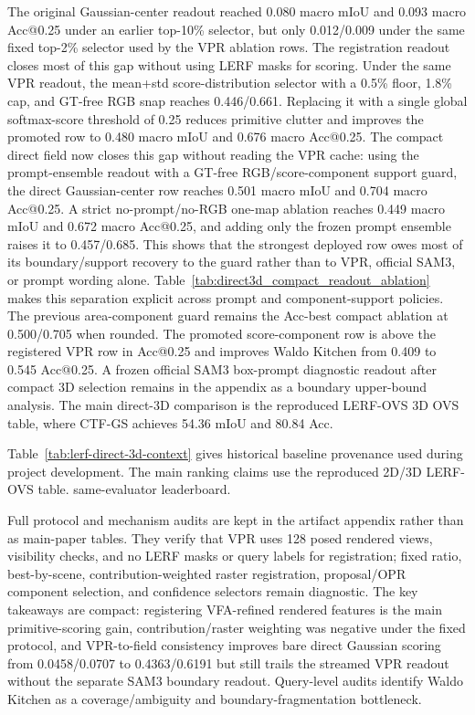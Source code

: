 \documentclass[10pt,twocolumn,letterpaper]{article}
\newcommand{\method}{CTF-GS}
\begin{document}


The original Gaussian-center readout reached 0.080 macro mIoU and 0.093 macro
Acc@0.25 under an earlier top-10\% selector, but only 0.012/0.009 under the same
fixed top-2\% selector used by the VPR ablation rows. The registration readout closes
most of this gap without using LERF masks for scoring. Under the same VPR
readout, the mean+std score-distribution selector with a 0.5\%
floor, 1.8\% cap, and GT-free RGB snap reaches 0.446/0.661. Replacing it with a
single global softmax-score threshold of 0.25 reduces primitive clutter and
improves the promoted row to 0.480 macro mIoU and 0.676 macro Acc@0.25.
The compact direct field now closes this gap without reading the VPR cache:
using the prompt-ensemble readout with a GT-free RGB/score-component support
guard, the direct Gaussian-center row reaches 0.501 macro mIoU and 0.704 macro
Acc@0.25. A strict no-prompt/no-RGB one-map ablation reaches 0.449 macro
mIoU and 0.672 macro Acc@0.25, and adding only the frozen prompt ensemble
raises it to 0.457/0.685. This shows that the strongest deployed row owes most
of its boundary/support recovery to the guard rather than to VPR, official
SAM3, or prompt wording alone.
Table~\ref{tab:direct3d_compact_readout_ablation} makes this separation
explicit across prompt and component-support policies. The
previous area-component guard remains the Acc-best compact ablation at
0.500/0.705 when rounded. The promoted score-component row is above the
registered VPR row in Acc@0.25 and improves Waldo
Kitchen from 0.409 to 0.545 Acc@0.25. A frozen official SAM3 box-prompt
diagnostic readout after compact 3D selection remains in the appendix as a
boundary upper-bound analysis. The main direct-3D comparison is the reproduced
LERF-OVS 3D OVS table, where \method{} achieves 54.36 mIoU and 80.84 Acc.



Table~\ref{tab:lerf-direct-3d-context} gives historical baseline provenance
used during project development. The main ranking claims use the reproduced
2D/3D LERF-OVS table.
same-evaluator leaderboard.

Full protocol and mechanism audits are kept in the artifact appendix rather
than as main-paper tables. They verify that VPR uses 128 posed rendered views,
visibility checks, and no LERF masks or query labels for registration; fixed
ratio, best-by-scene, contribution-weighted raster registration, proposal/OPR
component selection, and confidence selectors remain diagnostic. The key
takeaways are compact: registering VFA-refined rendered features is the main
primitive-scoring gain, contribution/raster weighting was negative under the
fixed protocol, and VPR-to-field consistency improves bare direct Gaussian
scoring from 0.0458/0.0707 to 0.4363/0.6191 but still trails the streamed VPR
readout without the separate SAM3 boundary readout. Query-level audits identify
Waldo Kitchen as a coverage/ambiguity and boundary-fragmentation bottleneck.
\end{document}
